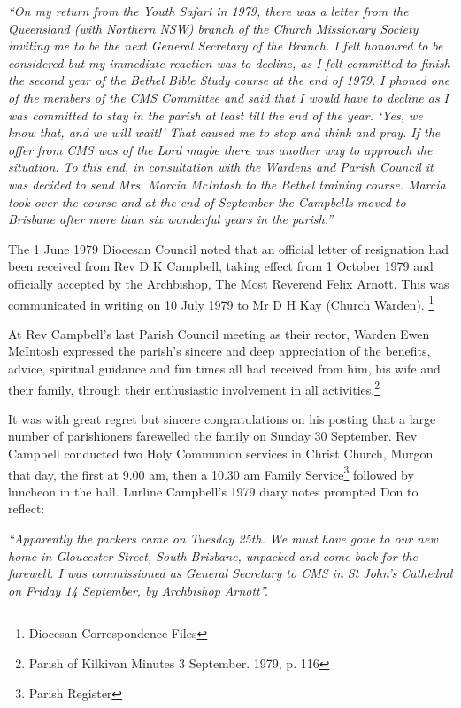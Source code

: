 \emph{``On my return from the Youth Safari in 1979, there was a letter from the Queensland (with Northern NSW) branch of the Church Missionary Society inviting me to be the next General Secretary of the Branch. I felt honoured to be considered but my immediate reaction was to decline, as I felt committed to finish the second year of the Bethel Bible Study course at the end of 1979. I phoned one of the members of the CMS Committee and said that I would have to decline as I was committed to stay in the parish at least till the end of the year. `Yes, we know that, and we will wait!' That caused me to stop and think and pray. If the offer from CMS was of the Lord maybe there was another way to approach the situation. To this end, in consultation with the Wardens and Parish Council it was decided to send Mrs. Marcia McIntosh to the Bethel training course. Marcia took over the course and at the end of September the Campbells moved to Brisbane after more than six wonderful years in the parish.''}



The 1 June 1979 Diocesan Council noted that an official letter of resignation had been received from Rev D K Campbell, taking effect from 1 October 1979 and officially accepted by the Archbishop, The Most Reverend Felix Arnott. This was communicated in writing on 10 July 1979 to Mr D H Kay (Church Warden). \footnote{Diocesan Correspondence Files}


At Rev Campbell's last Parish Council meeting as their rector, Warden Ewen McIntosh expressed the parish's sincere and deep appreciation of the benefits, advice, spiritual guidance and fun times all had received from him, his wife and their family, through their enthusiastic involvement in all activities.\footnote{Parish of Kilkivan Minutes 3 September. 1979, p. 116}


It was with great regret but sincere congratulations on his posting that a large number of parishioners farewelled the family on Sunday 30 September. Rev Campbell conducted two Holy Communion services in Christ Church, Murgon that day, the first at 9.00 am, then a 10.30 am Family Service\footnote{Parish Register} followed by luncheon in the hall. Lurline Campbell's 1979 diary notes prompted Don to reflect:


\emph{``Apparently the packers came on Tuesday 25th. We must have gone to our new home in Gloucester Street, South Brisbane, unpacked and come back for the farewell. I was commissioned as General Secretary to CMS in St John's Cathedral on Friday 14 September, by Archbishop Arnott''.}



